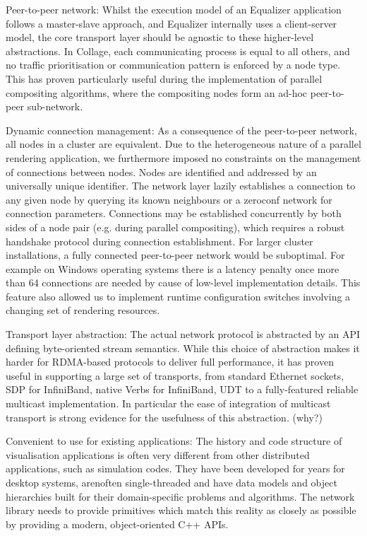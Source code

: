 \begin{compactdesc}

\item[Peer-to-peer network:] Whilst the execution model of an Equalizer
application follows a master-slave approach, and Equalizer internally uses a
client-server model, the core transport layer should be agnostic to these
higher-level abstractions. In Collage, each communicating process is equal to
all others, and no traffic prioritisation or communication pattern is enforced
by a node type. This has proven particularly useful during the implementation of
parallel compositing algorithms, where the compositing nodes form an ad-hoc
peer-to-peer sub-network.

\item[Dynamic connection management:] As a consequence of the peer-to-peer
network, all nodes in a cluster are equivalent. Due to the heterogeneous nature
of a parallel rendering application, we furthermore imposed no constraints on
the management of connections between nodes. Nodes are identified and addressed
by an universally unique identifier. The network layer lazily establishes a
connection to any given node by querying its known neighbours or a zeroconf
network for connection parameters. Connections may be established concurrently
by both sides of a node pair (e.g. during parallel compositing), which requires
a robust handshake protocol during connection establishment. For larger cluster
installations, a fully connected peer-to-peer network would be suboptimal. For
example on Windows operating systems there is a latency penalty once more than
64 connections are needed by cause of low-level implementation details. This feature
also allowed us to implement runtime configuration switches involving a
changing set of rendering resources.

\item[Transport layer abstraction:] The actual network protocol is abstracted
by an API defining byte-oriented stream semantics. While this choice of
abstraction makes it harder for RDMA-based protocols to deliver full
performance, it has proven useful in supporting a large set of transports, from
standard Ethernet sockets, SDP for InfiniBand, native Verbs for InfiniBand, UDT
to a fully-featured reliable multicast implementation. In particular the ease
of integration of multicast transport is strong evidence for the usefulness of
this abstraction. (why?)

\item[Convenient to use for existing applications:] The history and code
structure of visualisation applications is often very different from other
distributed applications, such as simulation codes. They have been developed for
years for desktop systems, arenoften single-threaded and have data models and
object hierarchies built for their domain-specific problems and algorithms. The
network library needs to provide primitives which match this reality as closely
as possible by providing a modern, object-oriented C++ APIs.

\end{compactdesc}


